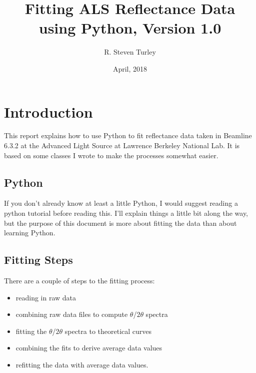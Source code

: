 \documentclass[english]{scrartcl}
\begin{document}
\title{Fitting ALS Reflectance Data using Python, Version 1.0}
\author{R. Steven Turley}
\date{April, 2018}

\maketitle
\tableofcontents{}

\section{Introduction}

This report explains how to use Python to fit reflectance data
taken in Beamline 6.3.2 at the Advanced Light Source at Lawrence
Berkeley National Lab. It is based on some classes I wrote to
make the processes somewhat easier.

\subsection{Python}
If you don't already know at least a little Python, I would suggest
reading a python tutorial before reading this. I'll explain
things a little bit along the way, but the purpose of this document
is more about fitting the data than about learning Python.

\subsection{Fitting Steps}
There are a couple of steps to the fitting process:
\begin{itemize}
\item reading in raw data
\item combining raw data files to compute $\theta$/$2\theta$ spectra
\item fitting the $\theta$/$2\theta$ spectra to theoretical curves
\item combining the fits to derive average data values
\item refitting the data with average data values.
\end{itemize}
\end{document}

